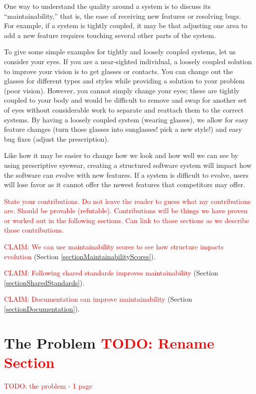 \documentclass[12pt,conference]{IEEEtran}
\newcommand\todo[1]{\textcolor{red}{#1}}
\begin{document}
One way to understand the quality around a system is to discuss its ``maintainability,'' that is, the ease of receiving new features or resolving bugs. For example, if a system is tightly coupled, it may be that adjusting one area to add a new feature requires touching several other parts of the system.

To give some simple examples for tightly and loosely coupled systems, let us consider your eyes. If you are a near-sighted individual, a loosely coupled solution to improve your vision is to get glasses or contacts. You can change out the glasses for different types and styles while providing a solution to your problem (poor vision). However, you cannot simply change your eyes; these are tightly coupled to your body and would be difficult to remove and swap for another set of eyes without considerable work to separate and reattach them to the correct systems. By having a loosely coupled system (wearing glasses), we allow for easy feature changes (turn those glasses into sunglasses! pick a new style!) and easy bug fixes (adjust the prescription).

Like how it may be easier to change how we look and how well we can see by using prescriptive eyewear, creating a structured software system will impact how the software can evolve with new features. If a system is difficult to evolve, users will lose favor as it cannot offer the newest features that competitors may offer.

\todo{State your contributions. Do not leave the reader to guess what my contributions are. Should be provable (refutable). Contributions will be things we have proven or worked out in the following sections. Can link to those sections as we describe those contributions.}

\todo{CLAIM: We can use maintainability scores to see how structure impacts evolution} (Section \ref{sectionMaintainabilityScores}).

\todo{CLAIM: Following shared standards improves maintainability} (Section \ref{sectionSharedStandards}).

\todo{CLAIM: Documentation can improve maintainability} (Section \ref{sectionDocumentation}).


\section{The Problem \todo{TODO: Rename Section}}
\todo{TODO: the problem - 1 page}
\end{document}
